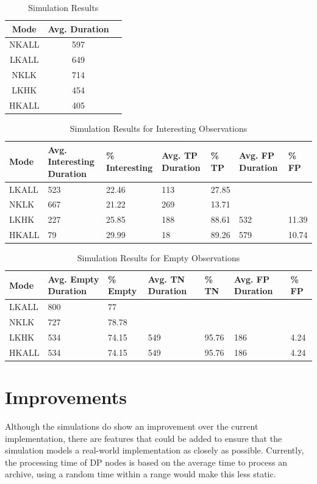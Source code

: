 \begin{table}[h]\footnotesize
\centering
\begin{tabular}{| c | c | c | }
\hline
Mode  & Avg. Duration \\
\hline
NKALL & 597 \\
LKALL & 649 \\
NKLK  & 714 \\
LKHK  & 454 \\
HKALL & 405 \\
\hline
\end{tabular}
\caption{Simulation Results}\label{tab:observ}
\end{table}

\begin{table}[h]\footnotesize
\begin{tabularx}{\textwidth}{ |X|X|X|X|X|X|X| }
\hline
Mode & Avg. Interesting Duration & \% Interesting & Avg. TP Duration & \% TP &	Avg. FP Duration & \% FP \\
\hline
LKALL & 523 & 22.46 & 113 & 27.85 & & \\
NKLK & 667 & 21.22 & 269 & 13.71 & & \\
LKHK & 227 & 25.85 & 188 & 88.61 & 532 & 11.39 \\
HKALL & 79 & 29.99 & 18 & 89.26 & 579 & 10.74 \\
\hline
\end{tabularx}
\caption{Simulation Results for Interesting Observations}\label{tab:observ_int}
\end{table}

\begin{table}[h]\footnotesize
\begin{tabularx}{\textwidth}{ |X|X|X|X|X|X|X| }
\hline
Mode & Avg. Empty Duration & \% Empty & Avg. TN Duration & \% TN & Avg. FP Duration & \% FP  \\
\hline
LKALL & 800 & 77 & & & & \\
NKLK & 727 & 78.78 & &  & & \\
LKHK & 534 & 74.15 & 549 & 95.76 & 186 & 4.24 \\
HKALL & 534 & 74.15 & 549 & 95.76 & 186 & 4.24 \\
\hline
\end{tabularx}
\caption{Simulation Results for Empty Observations}\label{tab:observ_empty}
\end{table}
	
\section{Improvements}
Although the simulations do show an improvement over the current implementation, there are features that could be added to ensure that the simulation models a real-world implementation as closely as possible. Currently, the processing time of DP nodes is based on the average time to process an archive, using a random time within a range would make this less static. 

